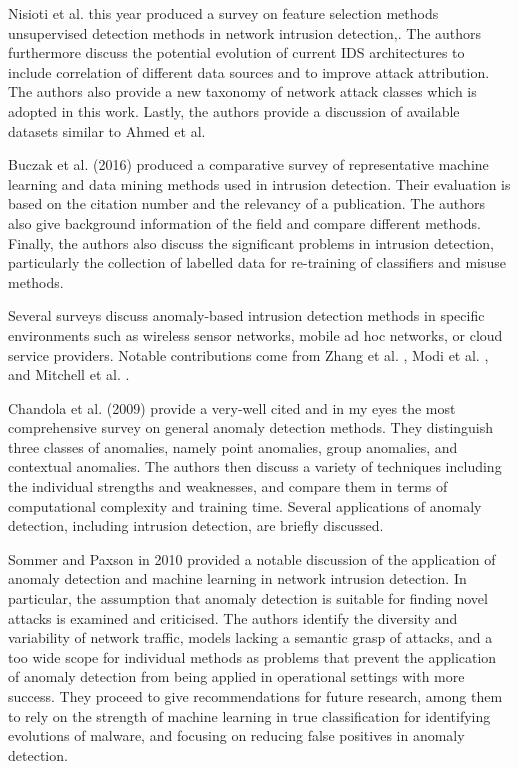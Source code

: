 \documentclass[a4paper,12pt,twoside]{report}
\begin{document}
Nisioti et al. \cite{nisioti_intrusion_2018} this year produced a survey on feature selection methods unsupervised detection methods in network intrusion detection,. The authors furthermore discuss the potential evolution of current IDS architectures to include correlation of different data sources and to improve attack attribution. The authors also provide a new taxonomy of network attack classes which is adopted in this work. Lastly, the authors provide a discussion of available datasets similar to Ahmed et al.


Buczak et al. \cite{buczak_survey_2016} (2016) produced a comparative survey of representative machine learning and data mining methods used in intrusion detection.  Their evaluation is based on the citation number and  the  relevancy of a publication.  The authors also give background information of the field and compare different methods. Finally, the authors also discuss the  significant  problems  in intrusion detection, particularly the collection of labelled data for re-training of classifiers and misuse methods.

Several surveys discuss anomaly-based intrusion detection methods in specific environments such as wireless sensor networks, mobile ad hoc networks, or cloud service providers. Notable contributions come from Zhang et al. \cite{yang_zhang_outlier_2010}, Modi et al. \cite{modi_survey_2013}, and Mitchell et al. \cite{mitchell_survey_2014}.

Chandola et al. \cite{chandola_anomaly_2009} (2009) provide a very-well cited and in my eyes the most comprehensive survey on general anomaly detection methods. They distinguish three classes of anomalies, namely point anomalies, group anomalies, and contextual anomalies. The authors then discuss a variety of techniques including the individual strengths and weaknesses, and compare them in terms of computational complexity and training time. Several applications of anomaly detection, including intrusion detection, are briefly discussed. 

Sommer and Paxson \cite{sommer_outside_2010} in 2010 provided a notable discussion of the application of anomaly detection and machine learning in network intrusion detection. In particular, the assumption that anomaly detection is suitable for finding novel attacks is examined and criticised. The authors identify the diversity and variability of network traffic, models lacking a semantic grasp of attacks, and a too wide scope for individual methods as problems that prevent the application of anomaly detection from being applied in operational settings with more success. They proceed to give recommendations for future research, among them to rely on the strength of machine learning in true classification for identifying evolutions of malware, and focusing on reducing false positives in anomaly detection.
\end{document}
